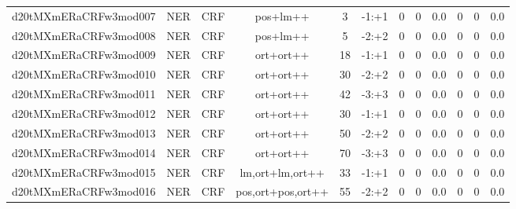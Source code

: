 \documentclass[a4paper]{article}
\begin{document}
\begin{landscape}
\begin{center}
\begin{tabular}{ |c|c|c|c|c|c|c|c|c|c|c|c|}
 
 	
 	\small{ d20tMXmERaCRFw3mod007 } & \small{ NER} & \small{  CRF }  & pos+lm++  &  3 &  \small{  -1:+1 }  &  0 & 0 & 0.0  &  0 & 0 & 0.0 \\
 	

 
 	
 	\small{ d20tMXmERaCRFw3mod008 } & \small{ NER} & \small{  CRF }  & pos+lm++  &  5 &  \small{  -2:+2 }  &  0 & 0 & 0.0  &  0 & 0 & 0.0 \\
 	

 
 	
 	\small{ d20tMXmERaCRFw3mod009 } & \small{ NER} & \small{  CRF }  & ort+ort++  &  18 &  \small{  -1:+1 }  &  0 & 0 & 0.0  &  0 & 0 & 0.0 \\
 	

 
 	
 	\small{ d20tMXmERaCRFw3mod010 } & \small{ NER} & \small{  CRF }  & ort+ort++  &  30 &  \small{  -2:+2 }  &  0 & 0 & 0.0  &  0 & 0 & 0.0 \\
 	

 
 	
 	\small{ d20tMXmERaCRFw3mod011 } & \small{ NER} & \small{  CRF }  & ort+ort++  &  42 &  \small{  -3:+3 }  &  0 & 0 & 0.0  &  0 & 0 & 0.0 \\
 	

 
 	
 	\small{ d20tMXmERaCRFw3mod012 } & \small{ NER} & \small{  CRF }  & ort+ort++  &  30 &  \small{  -1:+1 }  &  0 & 0 & 0.0  &  0 & 0 & 0.0 \\
 	

 
 	
 	\small{ d20tMXmERaCRFw3mod013 } & \small{ NER} & \small{  CRF }  & ort+ort++  &  50 &  \small{  -2:+2 }  &  0 & 0 & 0.0  &  0 & 0 & 0.0 \\
 	

 
 	
 	\small{ d20tMXmERaCRFw3mod014 } & \small{ NER} & \small{  CRF }  & ort+ort++  &  70 &  \small{  -3:+3 }  &  0 & 0 & 0.0  &  0 & 0 & 0.0 \\
 	

 
 	
 	\small{ d20tMXmERaCRFw3mod015 } & \small{ NER} & \small{  CRF }  & lm,ort+lm,ort++  &  33 &  \small{  -1:+1 }  &  0 & 0 & 0.0  &  0 & 0 & 0.0 \\
 	

 
 	
 	\small{ d20tMXmERaCRFw3mod016 } & \small{ NER} & \small{  CRF }  & pos,ort+pos,ort++  &  55 &  \small{  -2:+2 }  &  0 & 0 & 0.0  &  0 & 0 & 0.0 \\
 	


\end{tabular}
\end{center}
\end{landscape}
\end{document}
